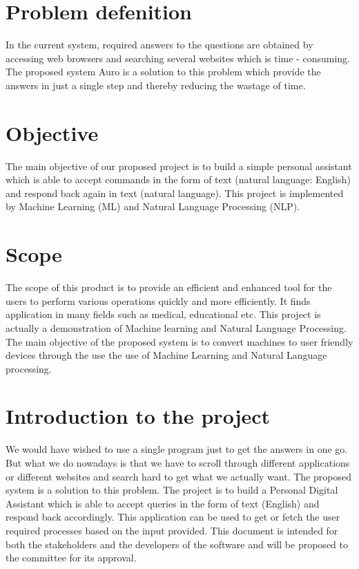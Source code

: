 \section{Problem defenition}
In the current system, required answers to the questions are obtained by accessing web browsers and searching several websites which is time - consuming. The proposed system Auro is a solution to this problem which provide the answers in just a single step and thereby reducing the wastage of time.
\section{Objective}
The main objective of our proposed project is to build a simple personal assistant which is able to accept commands in the form of text (natural language: English) and respond back again in text (natural language). This project is implemented by Machine Learning (ML) and Natural Language Processing (NLP).  

\section{Scope}
The scope of this product is to provide an efficient and enhanced tool for the users to perform various operations quickly and more efficiently.  It finds application in many fields such as medical, educational etc.  This project is actually a demonstration of Machine learning and Natural Language Processing.  The main objective of the proposed system is to convert machines to user friendly devices through the use the use of Machine Learning and Natural Language processing.

\section{Introduction to the project}
We would have wished to use a single program just to get the answers in one go.  But what we do nowadays is that we have to scroll through different applications or different websites and search hard to get what we actually want.  The proposed system is a solution to this problem.  The project is to build a Personal Digital Assistant which is able to accept queries in the form of text (English) and respond back accordingly.  This application can be used to get or fetch the user required processes based on the input provided.  This document is intended for both the stakeholders and the developers of the software and will be proposed to the committee for its approval.